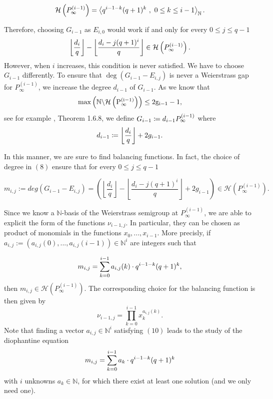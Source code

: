 \documentclass[10pt]{article}
\begin{document}
\[\mathcal{H}\left(P^{(i-1)}_{\infty}\right) = \left \langle q^{i-1-k}(q+1)^k \ , \ 0\leq k \leq i-1 \right\rangle_{\mathbb{N}}.\]

Therefore, choosing $G_{i-1}$ as $E_{i,0}$ would work if and only for every $0 \leq j \leq q-1$
\[ \left\lfloor \dfrac{d_i}{q} \right\rfloor - \left\lfloor \dfrac{d_i-j(q+1)^i}{q}\right\rfloor \in \mathcal{H}\left(P^{(i-1)}_{\infty}\right).\]
However, when $i$ increases, this condition is never satisfied. We have to choose $G_{i-1}$ differently.  To ensure that 
$\deg(G_{i-1}-E_{i,j})$ is never a Weierstrass gap for $P_{\infty}^{(i-1)}$, we increase the degree $d_{i-1}$ of $G_{i-1}$. As we know that
\[\rm{max}\left(\mathbb{N} \backslash \mathcal{H}\left(P^{(i-1)}_{\infty}\right)\right) \leq 2g_{i-1} -1,\]
see for example \cite{S08}, Theorem 1.6.8, we define $G_{i-1}\coloneqq d_{i-1} P^{(i-1)}_{\infty}$ where
\begin{equation}\label{eq:deg_herm}
d_{i-1} \coloneqq \left\lfloor \dfrac{d_i}{q}\right\rfloor + 2g_{i-1}.
\end{equation}


In this manner, we are sure to find balancing functions. In fact, the choice of degree in $(8)$ ensure that for every $0 \leq j \leq q-1$ 

\begin{equation}
m_{i,j}:=deg(G_{i-1}-E_{i,j}) =  \left(\left\lfloor \dfrac{d_i}{q} \right\rfloor - \left\lfloor \dfrac{d_i-j(q+1)^i}{q}\right\rfloor + 2g_{i-1} \right) \in \mathcal{H}\left(P_{\infty}^{(i-1)}\right).
\end{equation}

Since we know a $\mathbb{N}$-basis of the Weierstrass semigroup at $P_{\infty}^{(i-1)}$, we are able to explicit the form of the functions $\nu_{i-1,j}$. In particular, they can be chosen as product of monomials in the functions $x_0,...,x_{i-1}$. More precisly, if $a_{i,j} := (a_{i,j}(0),...,a_{i,j}(i-1)) \in \mathbb{N}^i$ are integers such that

\begin{equation}
m_{i,j} = \sum\limits_{k=0}^{i-1} a_{i,j}(k) \cdot q^{i-1-k}(q+1)^k,
\end{equation}
then $m_{i,j} \in \mathcal{H}\left(P_{\infty}^{(i-1)}\right)$. The corresponding choice for the balancing function is then given by 
\[ \nu_{i-1,j} = \prod\limits_{k=0}^{i-1} x_k^{a_{i,j}(k)}.\]
Note that finding a vector $a_{i,j} \in \mathbb{N}^i$ satisfying $(10)$ leads to the study of the diophantine equation
\[m_{i,j} = \sum\limits_{k=0}^{i-1} a_k \cdot q^{i-1-k}(q+1)^k\]
with $i$ unknowns $a_k \in \mathbb{N}$, for which there exist at least one solution (and we only need one).
\end{document}
